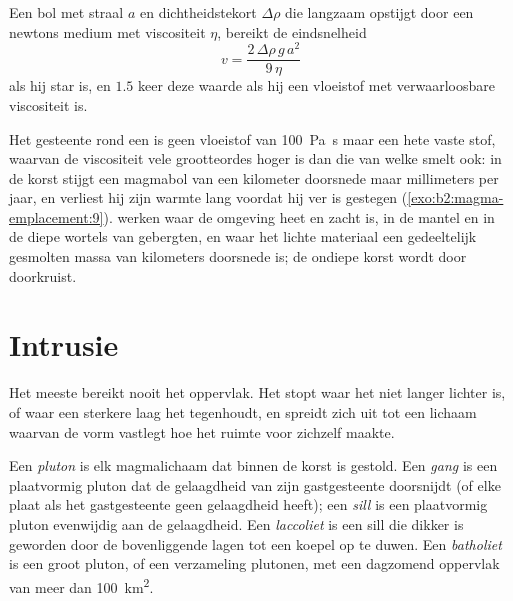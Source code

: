 \begin{proposition}\label{prop:b2:magma-emplacement:stokes}
Een bol met straal $a$ en dichtheidstekort $\Delta\rho$ die langzaam opstijgt door een
newtons medium met viscositeit $\eta$, bereikt de eindsnelheid
\[
v = \frac{2\,\Delta\rho\,g\,a^2}{9\,\eta}
\]
als hij star is, en $1.5$ keer deze waarde als hij een vloeistof met verwaarloosbare viscositeit is.
\end{proposition}
\admitted

Het gesteente rond een  is geen vloeistof van \qty{100}{Pa.s} maar een hete vaste stof,
waarvan de viscositeit vele grootteordes hoger is dan die van welke smelt ook: in de
korst stijgt een magmabol van een kilometer doorsnede maar millimeters per jaar, en
verliest hij zijn warmte lang voordat hij ver is gestegen (\cref{exo:b2:magma-emplacement:9}). 
werken waar de omgeving heet en zacht is, in de mantel en in de diepe
wortels van gebergten, en waar het lichte materiaal een gedeeltelijk gesmolten massa
van kilometers doorsnede is; de ondiepe korst wordt door  doorkruist.

\section{Intrusie}

Het meeste  bereikt nooit het oppervlak. Het stopt waar het niet langer lichter is,
of waar een sterkere laag het tegenhoudt, en spreidt zich uit tot een lichaam waarvan de vorm
vastlegt hoe het ruimte voor zichzelf maakte.

\begin{definition}\label{def:b2:magma-emplacement:bodies}
Een \emph{pluton} is elk magmalichaam dat binnen de
korst is gestold. Een \emph{gang} is een plaatvormig pluton dat de
gelaagdheid van zijn gastgesteente doorsnijdt (of elke plaat als het gastgesteente geen gelaagdheid heeft); een
\emph{sill} is een plaatvormig pluton evenwijdig aan de gelaagdheid. Een
\emph{laccoliet} is een sill die dikker is geworden door de
bovenliggende lagen tot een koepel op te duwen. Een \emph{batholiet} is een groot pluton,
of een verzameling plutonen, met een dagzomend oppervlak van meer dan \qty{100}{km^2}.
\end{definition}

